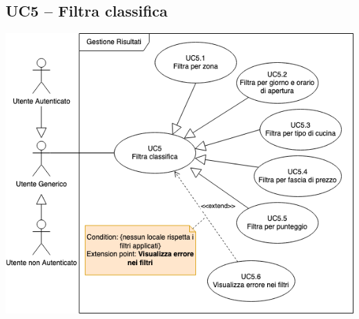 \subsection{UC5 – Filtra classifica}
\begin{center}
\includegraphics[scale=0.5]{UC_images/UC5.png}
\end{center}
